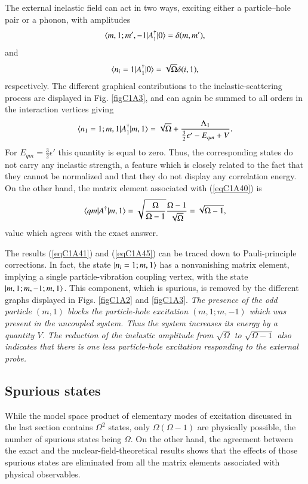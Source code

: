 The external inelastic field can act in two ways, exciting either a particle--hole pair or a phonon, with amplitudes 
 \begin{align}\label{eqC1A42} 
\langle {m,1;m',-1|A_1^\dagger|0} \rangle=\delta(m,m'),
 \end{align}
and
 \begin{align}\label{eqC1A43} 
\langle {n_i=1|A_1^\dagger|0} \rangle=\sqrt{\Omega}\delta(i,1),
 \end{align}
respectively. The different graphical contributions to the inelastic-scattering
process are displayed in Fig. \ref{figC1A3}, and can again be summed to all orders in the
interaction vertices giving
 \begin{align}\label{eqC1A44} 
\langle {n_1=1;m,1|A_1^\dagger|m,1} \rangle=\sqrt{\Omega}+\frac{\Lambda_1}{\frac{3}{2}\epsilon'-E_{qm}+V}.
 \end{align}
For $E_{qm}=\frac{3}{2}\epsilon'$ this quantity is equal to zero. Thus, the corresponding states
do not carry any inelastic strength, a feature which is closely related to the
fact that they cannot be normalized and that they do not display any correlation energy.
On the other hand, the matrix element associated with (\ref{eqC1A40}) is
 \begin{align}\label{eqC1A45} 
\langle {qm|A^\dagger|m,1} \rangle=\sqrt{\frac{\Omega}{\Omega-1}}\frac{\Omega-1}{\sqrt{\Omega}}=\sqrt{\Omega-1},
 \end{align}
value which agrees with the exact answer.




The results (\ref{eqC1A41}) and (\ref{eqC1A45}) can be traced down to Pauli-principle corrections. In fact, the state $|{n_i=1;m,1} \rangle$ has a nonvanishing matrix element,
implying a single particle-vibration coupling vertex, with the state $|{m,1;m,-1;m,1} \rangle$. This component, which is spurious, is removed by the different graphs displayed in Figs. \ref{figC1A2} and \ref{figC1A3}. \textit{The presence of the odd particle
$(m, 1)$ blocks the particle-hole excitation $(m,1; m,- 1)$ which was present in
the uncoupled system. Thus the system increases its energy by a quantity $V$.
The reduction of the inelastic amplitude from $\sqrt{\Omega}$ to $\sqrt{\Omega-1}$  also indicates
that there is one less particle-hole excitation responding to the external probe.}
\subsection{Spurious states}\label{C1S7sS3}
While the model space product of elementary modes of excitation discussed
in the last section contains $\Omega^2$ states, only $\Omega(\Omega-1)$ are physically possible,
the number of spurious states being $\Omega$.  On the other hand, the agreement
between the exact and the nuclear-field-theoretical results shows that the effects of those spurious states are eliminated from all the matrix elements associated with physical observables.


